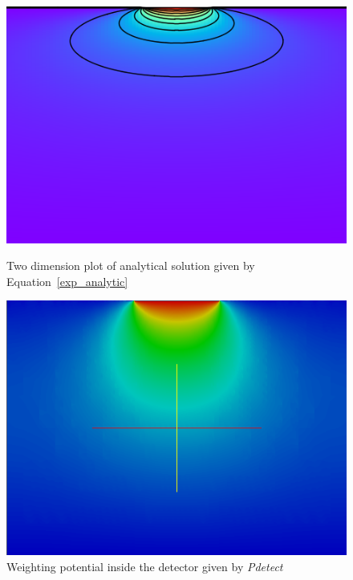 \documentclass[11pt]{article}
\begin{document}
			\begin{figure}[H]
				\begin{minipage}[b]{.46\linewidth}
					\center
					\includegraphics[scale=0.5]{images/boundary_conditions/detector/plot_analytic.png}
					\caption{Two dimension plot of analytical solution given by Equation~\ref{exp_analytic}}
					\label{fig:plot_analytic}
				\end{minipage} \hfill
				\begin{minipage}[b]{.46\linewidth}
					\center
					\includegraphics[scale=0.4]{images/boundary_conditions/detector/w_semi_free_conditions.png}
					\caption{Weighting potential inside the detector given by \textit{Pdetect}}
					\label{fig:w_semi_free_conditions}
				\end{minipage}
			\end{figure}
\end{document}

